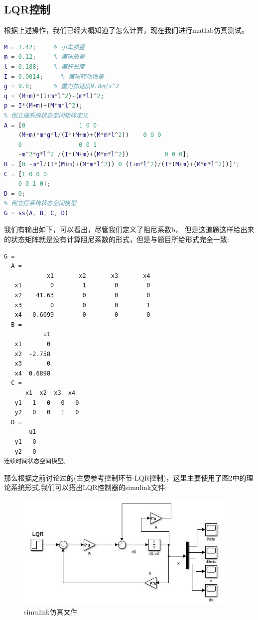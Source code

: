 \documentclass{article}
\begin{document}
\subsection*{LQR控制}
根据上述操作，我们已经大概知道了怎么计算，现在我们进行matlab仿真测试。
\begin{lstlisting}[language=matlab,numbers=none]
% 倒立摆系统参数
M = 1.42;     % 小车质量
m = 0.12;     % 摆球质量
l = 0.188;    % 摆杆长度
I = 0.0014;     % 摆球转动惯量
g = 9.8;      % 重力加速度9.8m/s^2
q = (M+m)*(I+m*l^2)-(m*l)^2;
p = I*(M+m)+(M*m*l^2);
% 倒立摆系统状态空间矩阵定义
A = [0               1 0 0
    (M+m)*m*g*l/(I*(M+m)+(M*m*l^2))    0 0 0
    0                0 0 1
    -m^2*g*l^2 /(I*(M+m)+(M*m*l^2))          0 0 0];
B = [0 -m*l/(I*(M+m)+(M*m*l^2)) 0 (I+m*l^2)/(I*(M+m)+(M*m*l^2))]';
C = [1 0 0 0
    0 0 1 0];
D = 0;
% 倒立摆系统状态空间模型
G = ss(A, B, C, D)
\end{lstlisting}
我们有输出如下，可以看出，尽管我们定义了阻尼系数b，
但是这道题这样给出来的状态矩阵就是没有计算阻尼系数的形式，但是与题目所给形式完全一致:
\begin{lstlisting}[numbers=none]
G =
  A = 
            x1       x2       x3       x4
   x1        0        1        0        0
   x2    41.63        0        0        0
   x3        0        0        0        1
   x4  -0.6099        0        0        0
  B = 
           u1
   x1       0
   x2  -2.758
   x3       0
   x4  0.6898
  C = 
      x1  x2  x3  x4
   y1   1   0   0   0
   y2   0   0   1   0
  D = 
       u1
   y1   0 
   y2   0
连续时间状态空间模型。
\end{lstlisting}
那么根据之前讨论过的(主要参考控制环节-LQR控制)，这里主要使用了图2中的理论系统形式,我们可以搭出LQR控制器的simulink文件:
\begin{figure}[htbp]
    \centering
    \includegraphics[width=0.95\textwidth]{imgs/simulink_lqr.png}
    \caption{simulink仿真文件}    
\end{figure}
\end{document}
